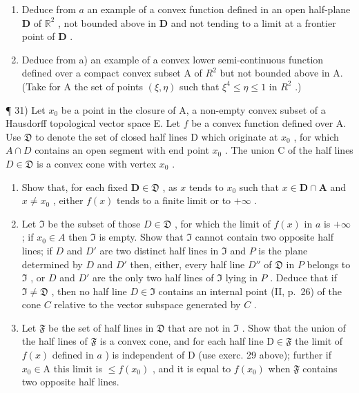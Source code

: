 \begin{enumerate}
\def\labelenumi{\alph{enumi})}
\setcounter{enumi}{1}
\item
  Deduce from \(a\) an example of a convex function defined in an open half-plane \(\mathbf{D}\) of \(\mathbb{R}^2\) , not bounded above in \(\mathbf{D}\) and not tending to a limit at a frontier point of \(\mathbf{D}\) .
\item
  Deduce from a) an example of a convex lower semi-continuous function defined over a compact convex subset A of \(R^{2}\) but not bounded above in A. (Take for A the set of points \((\xi, \eta)\) such that \(\xi^{4} \leqslant \eta \leqslant 1\) in \(R^{2}\) .)
\end{enumerate}

¶ 31) Let \(x_0\) be a point in the closure of A, a non-empty convex subset of a Hausdorff topological vector space E. Let \(f\) be a convex function defined over A. Use \(\mathfrak{D}\) to denote the set of closed half lines D which originate at \(x_0\) , for which \(A \cap D\) contains an open segment with end point \(x_0\) . The union C of the half lines \(D \in \mathfrak{D}\) is a convex cone with vertex \(x_0\) .

\begin{enumerate}
\def\labelenumi{\alph{enumi})}
\item
  Show that, for each fixed \(\mathbf{D} \in \mathfrak{D}\) , as \(x\) tends to \(x_0\) such that \(x \in \mathbf{D} \cap \mathbf{A}\) and \(x \neq x_0\) , either \(f(x)\) tends to a finite limit or to \(+\infty\) .
\item
  Let \(\mathfrak{I}\) be the subset of those \(D \in \mathfrak{D}\) , for which the limit of \(f(x)\) in \(a\) is \(+\infty\) ; if \(x_0 \in A\) then \(\mathfrak{I}\) is empty. Show that \(\mathfrak{I}\) cannot contain two opposite half lines; if \(D\) and \(D'\) are two distinct half lines in \(\mathfrak{I}\) and \(P\) is the plane determined by \(D\) and \(D'\) then, either, every half line \(D''\) of \(\mathfrak{D}\) in \(P\) belongs to \(\mathfrak{I}\) , or \(D\) and \(D'\) are the only two half lines of \(\mathfrak{I}\) lying in \(P\) . Deduce that if \(\mathfrak{I} \neq \mathfrak{D}\) , then no half line \(D \in \mathfrak{I}\) contains an internal point (II, p.~26) of the cone \(C\) relative to the vector subspace generated by \(C\) .
\item
  Let \(\mathfrak{F}\) be the set of half lines in \(\mathfrak{D}\) that are not in \(\mathfrak{I}\) . Show that the union of the half lines of \(\mathfrak{F}\) is a convex cone, and for each half line \(\mathrm{D} \in \mathfrak{F}\) the limit of \(f(x)\) defined in \(a\) ) is independent of \(\mathrm{D}\) (use exerc. 29 above); further if \(x_0 \in \mathrm{A}\) this limit is \(\leqslant f(x_0)\) , and it is equal to \(f(x_0)\) when \(\mathfrak{F}\) contains two opposite half lines.
\end{enumerate}

